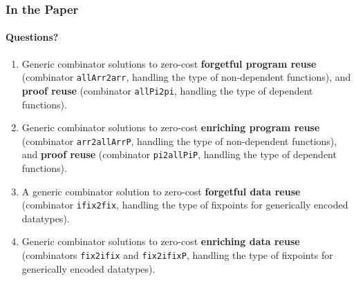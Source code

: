\documentclass[mathserif,usenames,dvipsnames]{beamer}
\begin{document}
\begin{frame}
\frametitle{In the Paper}
\framesubtitle{Questions?}

\begin{enumerate}
\item Generic combinator solutions to zero-cost
  \textbf{forgetful program reuse}
  (combinator \texttt{allArr2arr}, handling the type of non-dependent functions),
  and \textbf{proof reuse} (combinator \texttt{allPi2pi},
  handling the type of dependent functions).
\item Generic combinator solutions to zero-cost
  \textbf{enriching program reuse}
  (combinator \texttt{arr2allArrP}, handling the type of non-dependent functions),
  and \textbf{proof reuse} (combinator \texttt{pi2allPiP},
  handling the type of dependent functions).
\item A generic combinator solution to zero-cost
  \textbf{forgetful data reuse}
  (combinator \texttt{ifix2fix}, handling the type of fixpoints for
  generically encoded datatypes).
\item Generic combinator solutions to zero-cost
  \textbf{enriching data reuse}
  (combinators \texttt{fix2ifix} and \texttt{fix2ifixP}, handling the type of fixpoints for
  generically encoded datatypes).
\end{enumerate}

\end{frame}
\end{document}
